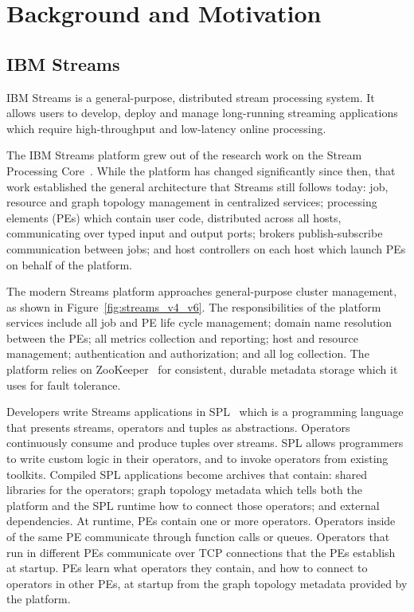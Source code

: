 \section{Background and Motivation}

\subsection{IBM Streams}

IBM Streams is a general-purpose, distributed stream processing system. It
allows users to develop, deploy and manage long-running streaming applications
which require high-throughput and low-latency online processing.

The IBM Streams platform grew out of the research work on the Stream Processing
Core~\cite{spc-2006}.  While the platform has changed significantly since then,
that work established the general architecture that Streams still follows today:
job, resource and graph topology management in centralized services; processing
elements (PEs) which contain user code, distributed across all hosts,
communicating over typed input and output ports; brokers publish-subscribe
communication between jobs; and host controllers on each host which
launch PEs on behalf of the platform.

The modern Streams platform approaches general-purpose cluster management, as
shown in Figure~\ref{fig:streams_v4_v6}. The responsibilities of the platform
services include all job and PE life cycle management; domain name resolution
between the PEs; all metrics collection and reporting; host and resource
management; authentication and authorization; and all log collection. The
platform relies on ZooKeeper~\cite{zookeeper} for consistent, durable metadata
storage which it uses for fault tolerance.

Developers write Streams applications in SPL~\cite{spl-2017} which is a
programming language that presents streams, operators and tuples as
abstractions. Operators continuously consume and produce tuples over streams.
SPL allows programmers to write custom logic in their operators, and to invoke
operators from existing toolkits. Compiled SPL applications become archives that
contain: shared libraries for the operators; graph topology metadata which tells
both the platform and the SPL runtime how to connect those operators; and
external dependencies. At runtime, PEs contain one or more operators. Operators
inside of the same PE communicate through function calls or queues. Operators
that run in different PEs communicate over TCP connections that the PEs
establish at startup. PEs learn what operators they contain, and how to connect
to operators in other PEs, at startup from the graph topology metadata provided
by the platform.

